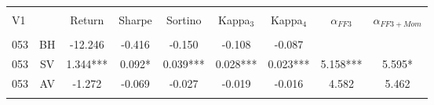 
\begin{tabular}{@{\extracolsep{5pt}} Hcccccccc} 
\\[-1.8ex]\hline 
\hline \\[-1.8ex] 
V1 &  & Return & Sharpe & Sortino & Kappa$_{3}$ & Kappa$_{4}$ & $\alpha_{FF3}$ & $\alpha_{FF3+Mom}$ \\ 
\hline \\[-1.8ex] 
053 & BH & -12.246 & -0.416 & -0.150 & -0.108 & -0.087 &  &  \\ 
053 & SV & 1.344*** & 0.092* & 0.039*** & 0.028*** & 0.023*** & 5.158*** & 5.595* \\ 
053 & AV & -1.272 & -0.069 & -0.027 & -0.019 & -0.016 & 4.582 & 5.462 \\ 
\hline \\[-1.8ex] 
\end{tabular} 
